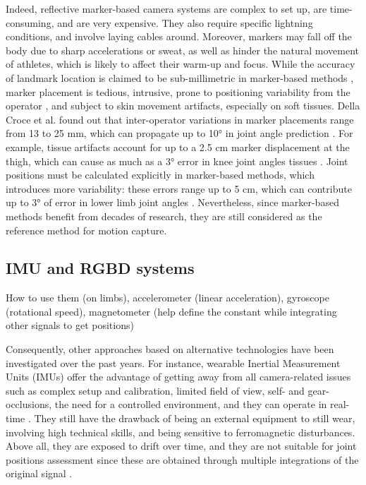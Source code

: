 Indeed, reflective marker-based camera systems are complex to set up, are time-consuming, and are very expensive. They also require specific lightning conditions, and involve laying cables around. Moreover, markers may fall off the body due to sharp accelerations or sweat, as well as hinder the natural movement of athletes, which is likely to affect their warm-up and focus. While the accuracy of landmark location is claimed to be sub-millimetric in marker-based methods \cite{Topley2020}, marker placement is tedious, intrusive, prone to positioning variability from the operator \cite{Tsushima2003}, and subject to skin movement artifacts, especially on soft tissues. Della Croce et al. found out that inter-operator variations in marker placements range from 13 to 25 mm, which can propagate up to 10° in joint angle prediction \cite{Gorton2009,Croce1999}. For example, tissue artifacts account for up to a 2.5 cm marker displacement at the thigh, which can cause as much as a 3° error in knee joint angles tissues \cite{Benoit2015,Cappozzo1995}. Joint positions must be calculated explicitly in marker-based methods, which introduces more variability: these errors range up to 5 cm, which can contribute up to 3° of error in lower limb joint angles \cite{Leboeuf2019}. Nevertheless, since marker-based methods benefit from decades of research, they are still considered as the reference method for motion capture.

\subsection{IMU and RGBD systems}

How to use them (on limbs), accelerometer (linear acceleration), gyroscope (rotational speed), magnetometer (help define the constant while integrating other signals to get positions)

Consequently, other approaches based on alternative technologies have been investigated over the past years. For instance, wearable Inertial Measurement Units (IMUs) offer the advantage of getting away from all camera-related issues such as complex setup and calibration, limited field of view, self- and gear-occlusions, the need for a controlled environment, and they can operate in real-time \cite{Johnston2019,Chambers2015}. They still have the drawback of being an external equipment to still wear, involving high technical skills, and being sensitive to ferromagnetic disturbances. Above all, they are exposed to drift over time, and they are not suitable for joint positions assessment since these are obtained through multiple integrations of the original signal \cite{Ahmad2013}. 


